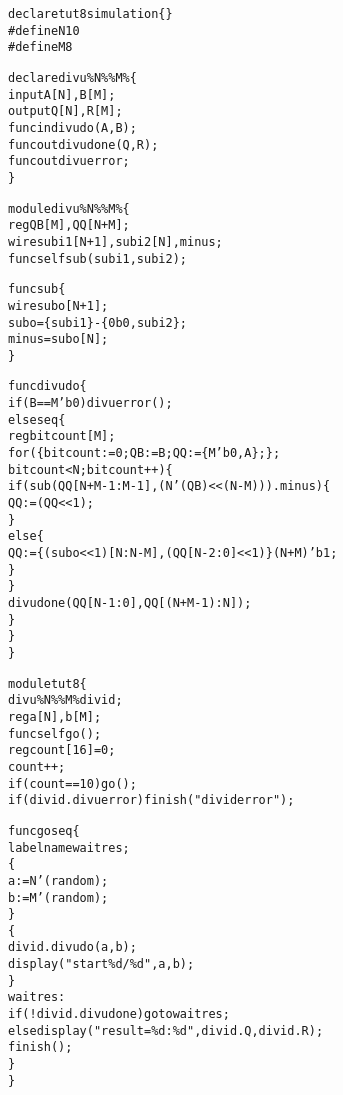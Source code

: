 \begin{reviewlist}
\begin{alltt}
declare tut8 simulation \{\}
\#define N 10
\#define M 8

declare divu\textunderscore{}\%N\%\textunderscore{}\%M\% \{
input A[N],B[M];
output Q[N],R[M];
func\textunderscore{}in divu\textunderscore{}do(A,B);
func\textunderscore{}out divu\textunderscore{}done(Q,R);
func\textunderscore{}out divu\textunderscore{}error;
\}

module divu\textunderscore{}\%N\%\textunderscore{}\%M\% \{
reg QB[M], QQ[N+M];
wire sub\textunderscore{}i1[N+1], sub\textunderscore{}i2[N], minus;
func\textunderscore{}self sub(sub\textunderscore{}i1,sub\textunderscore{}i2);

func sub \{
wire sub\textunderscore{}o[N+1];
 sub\textunderscore{}o = \{sub\textunderscore{}i1\} - \{0b0,sub\textunderscore{}i2\};
 minus=sub\textunderscore{}o[N];
\}

func divu\textunderscore{}do  \{
   if(B==M'b0) divu\textunderscore{}error();
   else seq \{
   reg bitcount[M];
   for( \{bitcount:=0; QB:=B; QQ:=\{M'b0,A\};\} ;
             bitcount \textless{} N ; bitcount++) \{
       if(sub(QQ[N+M-1:M-1],(N'(QB)\textless{}\textless{}(N-M))).minus) \{
        QQ := (QQ \textless{}\textless{} 1) ;
       \}
       else \{
        QQ := \{(sub\textunderscore{}o \textless{}\textless{} 1)[N:N-M],(QQ[N-2:0]\textless{}\textless{}1)\} \textbar{} (N+M)'b1;
       \}
        \}
   divu\textunderscore{}done(QQ[N-1:0],QQ[(N+M-1):N]);
   \}
   \}
\}

module tut8 \{
   divu\textunderscore{}\%N\%\textunderscore{}\%M\%  divid;
   reg  a[N], b[M];
   func\textunderscore{}self go();
   reg count[16]=0;
   count++;
   if(count == 10) go();
   if(divid.divu\textunderscore{}error) \textunderscore{}finish("divid error");

   func go seq \{
       label\textunderscore{}name wait\textunderscore{}res;
       \{
           a:=N'(\textunderscore{}random);
           b:=M'(\textunderscore{}random);
       \}
       \{
           divid.divu\textunderscore{}do(a,b);
           \textunderscore{}display("start \%d/\%d",a,b);
       \}
       wait\textunderscore{}res:
       if(!divid.divu\textunderscore{}done) goto wait\textunderscore{}res;
       else \textunderscore{}display("result = \%d : \%d",divid.Q, divid.R);
       \textunderscore{}finish();
   \}
\}
\end{alltt}
\end{reviewlist}


